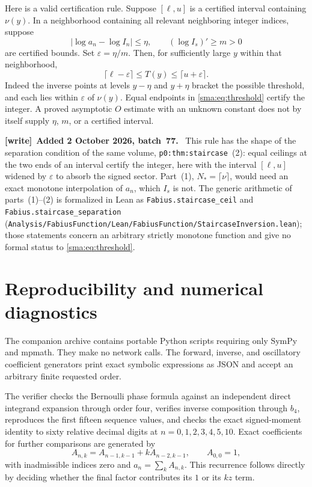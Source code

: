 \documentclass[11pt,letterpaper]{article}
\numberwithin{equation}{section}
\newenvironment{writenote}[1][]{\par\smallskip\begingroup\small
 \noindent\textbf{[write]}\if\relax\detokenize{#1}\relax\else~\textbf{#1.}\fi\ }%
 {\par\endgroup\smallskip}
\begin{document}
Here is a valid certification rule. Suppose $[\ell,u]$ is a certified interval containing $\nu(y)$. In a neighborhood containing all relevant neighboring integer indices, suppose
\[
 |\log a_n-\log I_n|\le\eta,\qquad
 (\log I_s)'\ge m>0
\]
are certified bounds. Set $\varepsilon=\eta/m$. Then, for sufficiently large $y$ within that neighborhood,
\begin{equation}\label{sma:eq:threshold}
 \lceil\ell-\varepsilon\rceil\le T(y)\le\lceil u+\varepsilon\rceil.
\end{equation}
Indeed the inverse points at levels $y-\eta$ and $y+\eta$ bracket the possible threshold, and each lies within $\varepsilon$ of $\nu(y)$. Equal endpoints in \eqref{sma:eq:threshold} certify the integer. A proved asymptotic $O$ estimate with an unknown constant does not by itself supply $\eta$, $m$, or a certified interval.

\begin{writenote}[Added 2 October 2026, batch~77]
This rule has the shape of the separation condition of the same volume,
\texttt{p0:thm:staircase}~(2): equal ceilings at the two ends of an interval
certify the integer, here with the interval $[\ell,u]$ widened by
$\varepsilon$ to absorb the signed sector. Part~(1),
$N_\ast=\lceil\nu\rceil$, would need an exact monotone interpolation of
$a_n$, which $I_s$ is not. The generic arithmetic of parts~(1)--(2) is
formalized in Lean as \texttt{Fabius.staircase\_ceil} and
\texttt{Fabius.staircase\_separation}
(\nolinkurl{Analysis/FabiusFunction/Lean/FabiusFunction/StaircaseInversion.lean});
those statements concern an arbitrary strictly monotone function and give no
formal status to \eqref{sma:eq:threshold}.
\end{writenote}

\section{Reproducibility and numerical diagnostics}
The companion archive contains portable Python scripts requiring only SymPy and mpmath. They make no network calls. The forward, inverse, and oscillatory coefficient generators print exact symbolic expressions as JSON and accept an arbitrary finite requested order.

The verifier checks the Bernoulli phase formula against an independent direct integrand expansion through order four, verifies inverse composition through $b_4$, reproduces the first fifteen sequence values, and checks the exact signed-moment identity to sixty relative decimal digits at $n=0,1,2,3,4,5,10$. Exact coefficients for further comparisons are generated by
\begin{equation}\label{sma:eq:recurrence}
 A_{n,k}=A_{n-1,k-1}+kA_{n-2,k-1},\qquad A_{0,0}=1,
\end{equation}
with inadmissible indices zero and $a_n=\sum_k A_{n,k}$. This recurrence follows directly by deciding whether the final factor contributes its $1$ or its $kz$ term.
\end{document}
